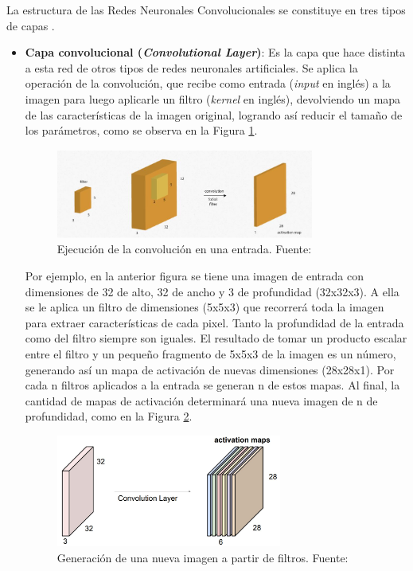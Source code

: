 \begin{itemize}
\begin{itemize}
		La estructura de las Redes Neuronales Convolucionales se constituye en tres tipos de capas \parencite{tec_lopez2016cnnTF}.
		\begin{itemize}
			\item \textbf{Capa convolucional (\textit{Convolutional Layer})}: Es la capa que hace distinta a esta red de otros tipos de redes neuronales artificiales. Se aplica la operación de la convolución, que recibe como entrada (\textit{input} en inglés) a la imagen para luego aplicarle un filtro (\textit{kernel} en inglés), devolviendo un mapa de las características de la imagen original, logrando así reducir el tamaño de los parámetros, como se observa en la Figura \ref{2:fig26}.
			\begin{figure}[h]
				\begin{center}
					\includegraphics[width=0.8\textwidth]{2/figures/convolucion.jpg}
					\caption{Ejecución de la convolución en una entrada. Fuente: \cite{tec_lopez2016cnnTF}}
					\label{2:fig26}
				\end{center}
			\end{figure}
			
			Por ejemplo, en la anterior figura se tiene una imagen de entrada con dimensiones de 32 de alto, 32 de ancho y 3 de profundidad (32x32x3). A ella se le aplica un filtro de dimensiones (5x5x3) que recorrerá toda la imagen para extraer características de cada pixel. Tanto la profundidad de la entrada como del filtro siempre son iguales. El resultado de tomar un producto escalar entre el filtro y un pequeño fragmento de 5x5x3 de la imagen es un número, generando así un mapa de activación de nuevas dimensiones (28x28x1). Por cada n filtros aplicados a la entrada se generan n de estos mapas. Al final, la cantidad de mapas de activación determinará una nueva imagen de n de profundidad, como en la Figura \ref{2:fig27}.
			\begin{figure}[h]
				\begin{center}
					\includegraphics[width=0.7\textwidth]{2/figures/filtros_cnn.jpg}
					\caption{Generación de una nueva imagen a partir de filtros. Fuente: \cite{tec_li2019cnn}}
					\label{2:fig27}
				\end{center}
			\end{figure}
			

\end{itemize}
\end{itemize}
\end{itemize}

